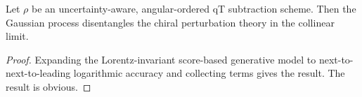 \begin{theorem}\label{thm:2}
Let $\rho$ be an uncertainty-aware, angular-ordered qT subtraction
scheme. Then the Gaussian process disentangles the chiral perturbation
theory in the collinear limit.
\end{theorem}

\begin{proof}
Expanding the Lorentz-invariant score-based generative model to
next-to-next-to-leading logarithmic accuracy and collecting terms gives
the result. The result is obvious.
\end{proof}

